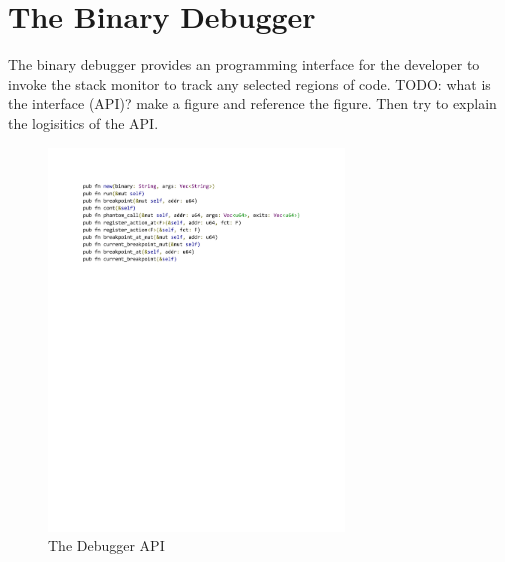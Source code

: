 \documentclass{article}
\begin{document}

\section{The Binary Debugger}

The binary debugger provides an programming interface for the developer to invoke the stack monitor to track any
selected regions of code.  TODO: what is the interface (API)? make a figure and reference the figure. Then try to
explain the logisitics of the API.

\begin{figure} \begin{center}
\includegraphics[height=4in]{api.pdf} \end{center}
\caption{The Debugger API}
\label{fig-workflow} \end{figure}
\end{document}
